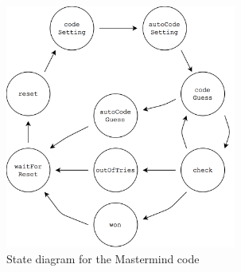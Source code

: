 \documentclass[a4paper, 11pt]{article}
\begin{document}
\begin{figure}[H] \centering
    \includegraphics[height=8cm]{res/state_machine}
    \caption{State diagram for the Mastermind code}
\end{figure}
\end{document}
